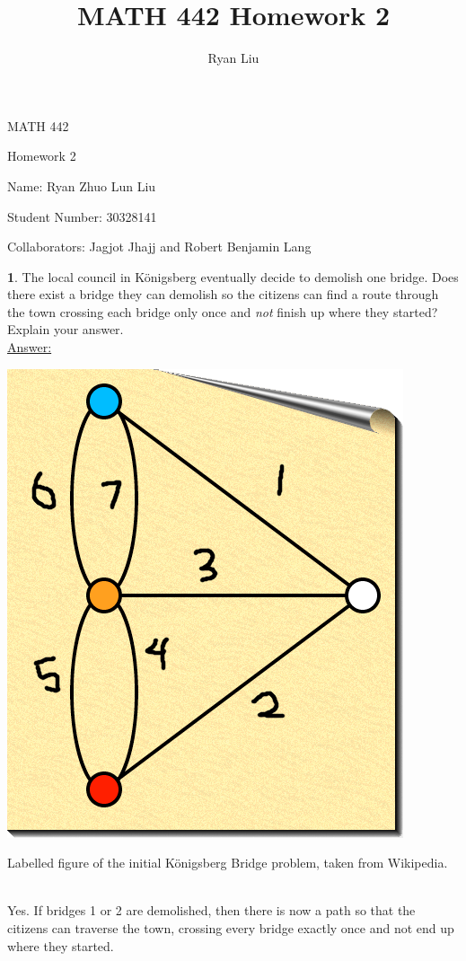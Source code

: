 \documentclass[12pt,a4paper]{article}
\author{Ryan Liu}
\title{MATH 442 Homework 2}
\theoremstyle{definition}
\newtheorem{problem}{}
\begin{document}
\begin{center}
{\huge MATH 442 \par}
{\Large Homework  2  \par}
{\normalsize Name: Ryan Zhuo Lun Liu \par}
{\normalsize Student Number: 30328141 \par}
{\normalsize Collaborators: Jagjot Jhajj and Robert Benjamin Lang }
\end{center}

\begin{problem}
The local council in K\"onigsberg eventually decide to demolish one bridge. Does there exist  a bridge they can demolish so the citizens can find a route through the town crossing each bridge only once and \emph{not} finish up where they started? Explain your answer. \\

\underline{Answer:} \\
\centerline{\includegraphics[scale=0.4]{bridge}}
\centerline{Labelled figure of the initial K\"onigsberg Bridge problem, taken from Wikipedia.} \\

Yes. If bridges 1 or 2 are demolished, then there is now a path so that the citizens can traverse the town, crossing every bridge exactly once and not end up where they started. \\


\end{problem}
\end{document}
